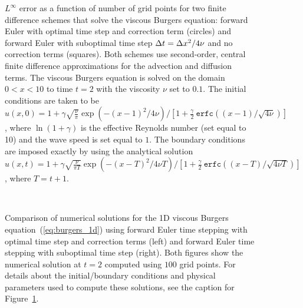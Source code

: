 \documentclass[oneeqnum,onefignum,onetabnum,onethmnum]{siamltex}
\begin{document}
\begin{figure}[htb]
\begin{center}
\caption{$L^\infty$ error as a function of number of grid points for
two finite difference schemes that solve the viscous Burgers equation:
forward Euler with optimal time step and correction term (circles)
and forward Euler with suboptimal time step $\Delta t = \Delta x^2/4\nu$ and no 
correction terms (squares).
Both schemes use second-order, central finite difference approximations for
the advection and diffusion terms.
The viscous Burgers equation is solved on the domain $0 < x < 10$ to 
time $t=2$ with the viscosity $\nu$ set to $0.1$.  The initial conditions are 
taken to be 
$u(x,0) = 1 + \gamma \sqrt{\frac{\nu}{\pi}} \exp\left( -(x-1)^2/4 \nu \right) 
            / \left[ 1 + \frac{\gamma}{2} \ 
                         \mathtt{erfc}\left((x-1)/\sqrt{4\nu} \right) 
    \right]$,
where $\ln(1+\gamma)$ is the effective Reynolds number (set equal to 10) and 
the wave speed is set equal to $1$.  The boundary conditions are imposed 
exactly by using
the analytical solution
$u(x,t) = 1 + \gamma \sqrt{\frac{\nu}{\pi T}} 
              \exp\left( -(x-T)^2/4 \nu T \right) 
            / \left[ 1 + \frac{\gamma}{2} \ 
                         \mathtt{erfc}\left((x-T)/\sqrt{4\nu T} \right) 
    \right]$,
where $T = t+1$.
}
\label{fig:burgers_1d_error}
\end{center}
\end{figure}

\begin{figure}[htb]
\begin{center}
\ \ \ \ \ 
\caption{Comparison of numerical solutions for the 1D viscous Burgers 
equation~(\ref{eq:burgers_1d}) using forward Euler time stepping with 
optimal time step and correction terms (left) and forward Euler time 
stepping with suboptimal time step (right).  Both figures show the 
numerical solution at $t = 2$ computed using $100$ grid points.
For details about the initial/boundary conditions and physical parameters 
used to compute these solutions, see the caption for 
Figure~\ref{fig:burgers_1d_error}. 
}
\label{fig:burgers_1d_solns}
\end{center}
\end{figure}
\end{document}
